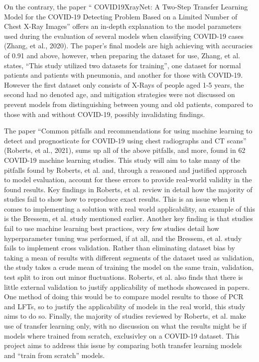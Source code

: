 On the contrary, the paper “ COVID19XrayNet: A Two-Step Transfer Learning Model for the COVID-19 Detecting Problem Based on a Limited Number of Chest X-Ray Images” offers an in-depth explanation to the model parameters used during the evaluation of several models when classifying COVID-19 cases (Zhang, et al., 2020). The paper’s final models are high achieving with accuracies of 0.91 and above, however, when preparing the dataset for use, Zhang, et al. states, “This study utilized two datasets for training”, one dataset for normal patients and patients with pneumonia, and another for those with COVID-19. However the first dataset only consists of X-Rays of people aged 1-5 years, the second had no denoted age, and mitigation strategies were not discussed on prevent models from distinguishing between young and old patients, compared to those with and without COVID-19, possibly invalidating findings.

The paper “Common pitfalls and recommendations for using machine learning to detect and prognosticate for COVID-19 using chest radiographs and CT scans” (Roberts, et al., 2021), sums up all of the above pitfalls, and more, found in 62 COVID-19 machine learning studies. This study will aim to take many of the pitfalls found by Roberts, et al. and, through a reasoned and justified approach to model evaluation, account for these errors to provide real-world validity in the found results. Key findings in Roberts, et al. review in detail how the majority of studies fail to show how to reproduce exact results. This is an issue when it comes to implementing a solution with real world applicability, an example of this is the Bressem, et al. study mentioned earlier. Another key finding is that studies fail to use machine learning best practices, very few studies detail how hyperparameter tuning was performed, if at all, and the Bressem, et al. study fails to implement cross validation. Rather than eliminating dataset bias by taking a mean of results with different segments of the dataset used as validation, the study takes a crude mean of training the model on the same train, validation, test split to iron out minor fluctuations. Roberts, et al. also finds that there is little external validation to justify applicability of methods showcased in papers. One method of doing this would be to compare model results to those of PCR and LFTs, so to justify the applicability of models in the real world, this study aims to do so. Finally, the majority of studies reviewed by Roberts, et al. make use of transfer learning only, with no discussion on what the results might be if models where trained from scratch, exclusivley on a COVID-19 dataset. This project aims to address this issue by comparing both transfer learning models and “train from scratch” models.
